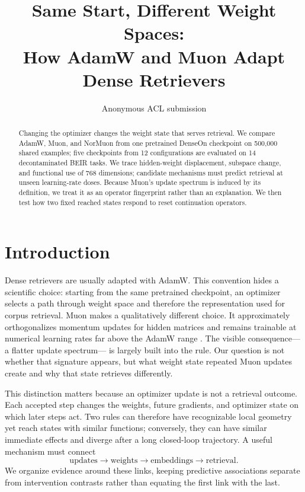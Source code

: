 \documentclass[11pt]{article}
\title{Same Start, Different Weight Spaces:\\
How AdamW and Muon Adapt Dense Retrievers}
\author{Anonymous ACL submission}
\begin{document}
\maketitle

\begin{abstract}
Changing the optimizer changes the weight state that serves retrieval. We compare AdamW, Muon, and
NorMuon from one pretrained DenseOn checkpoint on 500,000 shared examples; five checkpoints from
12 configurations are evaluated on 14 decontaminated BEIR tasks. \CorrectedAbstractFinding{} We
trace hidden-weight displacement, subspace change, and functional use of 768 dimensions; candidate
mechanisms must predict retrieval at unseen learning-rate doses. Because Muon's update spectrum is
induced by its definition, we treat it as an operator fingerprint rather than an explanation. We
then test how two fixed reached states respond to reset continuation operators.
\StateOperatorAbstractFinding{}
\end{abstract}

\section{Introduction}

Dense retrievers are usually adapted with AdamW. This convention hides a scientific choice:
starting from the same pretrained checkpoint, an optimizer selects a path through weight space and
therefore the representation used for corpus retrieval. Muon makes a qualitatively different
choice. It approximately orthogonalizes momentum updates for hidden matrices and remains trainable
at numerical learning rates far above the AdamW range
\citep{loshchilov2019decoupled,liu2025muon}. The visible consequence---a flatter update spectrum---
is largely built into the rule. Our question is not whether that signature appears, but what weight
state repeated Muon updates create and why that state retrieves differently.

This distinction matters because an optimizer update is not a retrieval outcome. Each accepted
step changes the weights, future gradients, and optimizer state on which later steps act. Two rules
can therefore have recognizable local geometry yet reach states with similar functions; conversely,
they can have similar immediate effects and diverge after a long closed-loop trajectory. A useful
mechanism must connect
\begin{equation*}
\text{updates}\rightarrow\text{weights}\rightarrow\text{embeddings}
\rightarrow\text{retrieval}.
\end{equation*}
We organize evidence around these links, keeping predictive associations separate from intervention
contrasts rather than equating the first link with the last.
\end{document}
